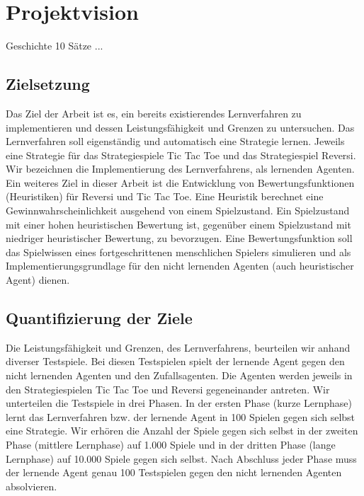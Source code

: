 \chapter{Projektvision}
\label{cha:projektvision}

Geschichte 10 Sätze ...

\section{Zielsetzung}
Das Ziel der Arbeit ist es, ein bereits existierendes Lernverfahren zu implementieren und dessen Leistungsfähigkeit und Grenzen zu untersuchen. Das Lernverfahren soll eigenständig und automatisch eine Strategie lernen. Jeweils eine Strategie für das Strategiespiele Tic Tac Toe und das Strategiespiel Reversi. Wir bezeichnen die Implementierung des Lernverfahrens, als lernenden Agenten.\\  

Ein weiteres Ziel in dieser Arbeit ist die Entwicklung von Bewertungsfunktionen (Heuristiken) für Reversi und Tic Tac Toe. Eine Heuristik berechnet eine Gewinnwahrscheinlichkeit ausgehend von einem Spielzustand. Ein Spielzustand mit einer hohen heuristischen Bewertung ist, gegenüber einem Spielzustand mit niedriger heuristischer Bewertung, zu bevorzugen. Eine Bewertungsfunktion soll das Spielwissen eines fortgeschrittenen menschlichen Spielers simulieren und als Implementierungsgrundlage für den nicht lernenden Agenten (auch heuristischer Agent) dienen.\\

\section{Quantifizierung der Ziele}
Die Leistungsfähigkeit und Grenzen, des Lernverfahrens, beurteilen wir anhand diverser Testspiele. Bei diesen Testspielen spielt der lernende Agent gegen den nicht lernenden Agenten und den Zufallsagenten. Die Agenten werden jeweils in den Strategiespielen Tic Tac Toe und Reversi gegeneinander antreten. Wir unterteilen die Testspiele in drei Phasen. In der ersten Phase (kurze Lernphase) lernt das Lernverfahren bzw. der lernende Agent in 100 Spielen gegen sich selbst eine Strategie. Wir erhören die Anzahl der Spiele gegen sich selbst in der zweiten Phase (mittlere Lernphase) auf 1.000 Spiele und in der dritten Phase (lange Lernphase) auf 10.000 Spiele gegen sich selbst. Nach Abschluss jeder Phase muss der lernende Agent genau 100 Testspielen gegen den nicht lernenden Agenten absolvieren. \\

